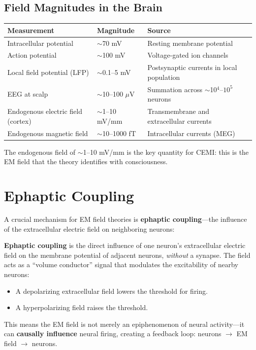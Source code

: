 \documentclass[11pt,a4paper]{report}
\begin{document}
\subsection{Field Magnitudes in the Brain}

\begin{center}
\renewcommand{\arraystretch}{1.3}
\begin{tabular}{>{\raggedright}p{4cm} >{\raggedright}p{3cm} >{\raggedright\arraybackslash}p{5.5cm}}
  \toprule
  \textbf{Measurement} & \textbf{Magnitude} & \textbf{Source} \\
  \midrule
  Intracellular potential & $\sim$70 mV & Resting membrane potential \\
  Action potential & $\sim$100 mV & Voltage-gated ion channels \\
  Local field potential (LFP) & $\sim$0.1--5 mV & Postsynaptic currents in local population \\
  EEG at scalp & $\sim$10--100 $\mu$V & Summation across $\sim$10$^4$--$10^5$ neurons \\
  Endogenous electric field (cortex) & $\sim$1--10 mV/mm & Transmembrane and extracellular currents \\
  Endogenous magnetic field & $\sim$10--1000 fT & Intracellular currents (MEG) \\
  \bottomrule
\end{tabular}
\end{center}

The endogenous field of $\sim$1--10 mV/mm is the key quantity for CEMI: this is the EM field that the theory identifies with consciousness.

\section{Ephaptic Coupling}

A crucial mechanism for EM field theories is \textbf{ephaptic coupling}---the influence of the extracellular electric field on neighboring neurons:

\begin{definitionbox}
\textbf{Ephaptic coupling} is the direct influence of one neuron's extracellular electric field on the membrane potential of adjacent neurons, \emph{without} a synapse. The field acts as a ``volume conductor'' signal that modulates the excitability of nearby neurons:
\begin{itemize}[leftmargin=1.5em]
  \item A depolarizing extracellular field lowers the threshold for firing.
  \item A hyperpolarizing field raises the threshold.
\end{itemize}
This means the EM field is not merely an epiphenomenon of neural activity---it can \textbf{causally influence} neural firing, creating a feedback loop: neurons $\to$ EM field $\to$ neurons.
\end{definitionbox}
\end{document}
